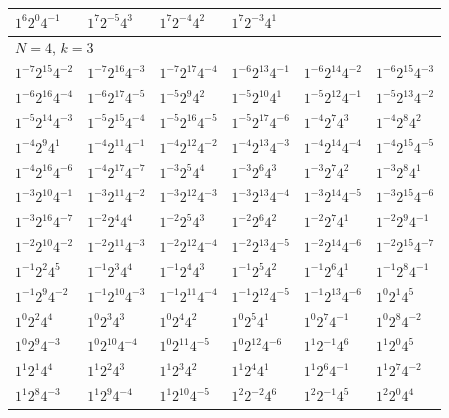 \documentclass[12pt]{amsart}
\numberwithin{equation}{section}
\theoremstyle{plain}
\theoremstyle{definition}
\theoremstyle{remark}
\begin{document}
\begin{longtable}{llllll}
$1^{6}2^{0}4^{-1}$ & $1^{7}2^{-5}4^{3}$ & $1^{7}2^{-4}4^{2}$ & $1^{7}2^{-3}4^{1}$ & &\\
\midrule
\multicolumn{6}{l}{$N=4$, $k=3$}\\
$1^{-7}2^{15}4^{-2}$ & $1^{-7}2^{16}4^{-3}$ & $1^{-7}2^{17}4^{-4}$ & $1^{-6}2^{13}4^{-1}$ & $1^{-6}2^{14}4^{-2}$ & $1^{-6}2^{15}4^{-3}$\\
$1^{-6}2^{16}4^{-4}$ & $1^{-6}2^{17}4^{-5}$ & $1^{-5}2^{9}4^{2}$ & $1^{-5}2^{10}4^{1}$ & $1^{-5}2^{12}4^{-1}$ & $1^{-5}2^{13}4^{-2}$\\
$1^{-5}2^{14}4^{-3}$ & $1^{-5}2^{15}4^{-4}$ & $1^{-5}2^{16}4^{-5}$ & $1^{-5}2^{17}4^{-6}$ & $1^{-4}2^{7}4^{3}$ & $1^{-4}2^{8}4^{2}$\\
$1^{-4}2^{9}4^{1}$ & $1^{-4}2^{11}4^{-1}$ & $1^{-4}2^{12}4^{-2}$ & $1^{-4}2^{13}4^{-3}$ & $1^{-4}2^{14}4^{-4}$ & $1^{-4}2^{15}4^{-5}$\\
$1^{-4}2^{16}4^{-6}$ & $1^{-4}2^{17}4^{-7}$ & $1^{-3}2^{5}4^{4}$ & $1^{-3}2^{6}4^{3}$ & $1^{-3}2^{7}4^{2}$ & $1^{-3}2^{8}4^{1}$\\
$1^{-3}2^{10}4^{-1}$ & $1^{-3}2^{11}4^{-2}$ & $1^{-3}2^{12}4^{-3}$ & $1^{-3}2^{13}4^{-4}$ & $1^{-3}2^{14}4^{-5}$ & $1^{-3}2^{15}4^{-6}$\\
$1^{-3}2^{16}4^{-7}$ & $1^{-2}2^{4}4^{4}$ & $1^{-2}2^{5}4^{3}$ & $1^{-2}2^{6}4^{2}$ & $1^{-2}2^{7}4^{1}$ & $1^{-2}2^{9}4^{-1}$\\
$1^{-2}2^{10}4^{-2}$ & $1^{-2}2^{11}4^{-3}$ & $1^{-2}2^{12}4^{-4}$ & $1^{-2}2^{13}4^{-5}$ & $1^{-2}2^{14}4^{-6}$ & $1^{-2}2^{15}4^{-7}$\\
$1^{-1}2^{2}4^{5}$ & $1^{-1}2^{3}4^{4}$ & $1^{-1}2^{4}4^{3}$ & $1^{-1}2^{5}4^{2}$ & $1^{-1}2^{6}4^{1}$ & $1^{-1}2^{8}4^{-1}$\\
$1^{-1}2^{9}4^{-2}$ & $1^{-1}2^{10}4^{-3}$ & $1^{-1}2^{11}4^{-4}$ & $1^{-1}2^{12}4^{-5}$ & $1^{-1}2^{13}4^{-6}$ & $1^{0}2^{1}4^{5}$\\
$1^{0}2^{2}4^{4}$ & $1^{0}2^{3}4^{3}$ & $1^{0}2^{4}4^{2}$ & $1^{0}2^{5}4^{1}$ & $1^{0}2^{7}4^{-1}$ & $1^{0}2^{8}4^{-2}$\\
$1^{0}2^{9}4^{-3}$ & $1^{0}2^{10}4^{-4}$ & $1^{0}2^{11}4^{-5}$ & $1^{0}2^{12}4^{-6}$ & $1^{1}2^{-1}4^{6}$ & $1^{1}2^{0}4^{5}$\\
$1^{1}2^{1}4^{4}$ & $1^{1}2^{2}4^{3}$ & $1^{1}2^{3}4^{2}$ & $1^{1}2^{4}4^{1}$ & $1^{1}2^{6}4^{-1}$ & $1^{1}2^{7}4^{-2}$\\
$1^{1}2^{8}4^{-3}$ & $1^{1}2^{9}4^{-4}$ & $1^{1}2^{10}4^{-5}$ & $1^{2}2^{-2}4^{6}$ & $1^{2}2^{-1}4^{5}$ & $1^{2}2^{0}4^{4}$\\

\end{longtable}
\end{document}
